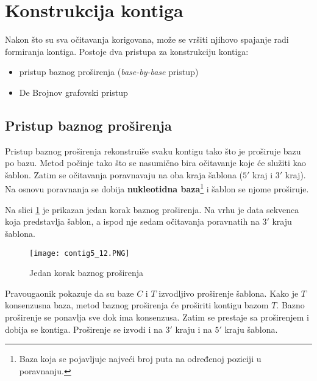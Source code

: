 \documentclass[12pt,oneside]{memoir}
\begin{document}
\section{Konstrukcija kontiga}
\label{poglavlje:KonstrukcijaKontiga}

Nakon što su sva očitavanja korigovana, može se vršiti njihovo spajanje radi formiranja kontiga. Postoje dva pristupa za konstrukciju kontiga:
\begin{itemize}
\itemsep0em 
    \item{pristup baznog proširenja (\textit{base-by-base} pristup)}
    \item{De Brojnov grafovski pristup}
\end{itemize}

\subsection{Pristup baznog proširenja}

Pristup baznog proširenja rekonstruiše svaku kontigu tako što je proširuje bazu po bazu. Metod počinje tako što se nasumično bira očitavanje koje će služiti kao šablon. Zatim se očitavanja poravnavaju na oba kraja šablona ($5'$ kraj i $3'$ kraj). Na osnovu poravnanja se dobija \textbf{nukleotidna baza}\footnote{Baza koja se pojavljuje najveći broj puta na određenoj poziciji u poravnanju.} i šablon se njome proširuje.

Na slici \ref{fig:7} je prikazan jedan korak baznog proširenja.
Na vrhu je data sekvenca koja predstavlja šablon, a ispod nje sedam očitavanja poravnatih na $3'$ kraju šablona.

\begin{figure}[!ht]
  \centering
  \texttt{[image: contig5\_12.PNG]}
\caption{Jedan korak baznog proširenja \cite{WingKinSung}}
\label{fig:7}
\end{figure}

\noindent Pravougaonik pokazuje da su baze $C$ i $T$ izvodljivo proširenje šablona. Kako je $T$ konsenzusna baza, metod baznog proširenja će proširiti kontigu bazom $T$. Bazno proširenje se ponavlja sve dok ima konsenzusa. Zatim se prestaje sa proširenjem i dobija se kontiga. Proširenje se izvodi i na $3'$ kraju i na $5'$ kraju šablona.

\begin{comment}
Slika \ref{fig:8} daje pseudokod ovog metoda.

\begin{figure}[!ht]
\centering
\texttt{[image: SimpleAsembler5\_13.PNG]}
\caption{Jednostavan base-by-base asembler proširenja \cite{WingKinSung}} 
\label{fig:8}
\end{figure}

\end{comment}
\end{document}
